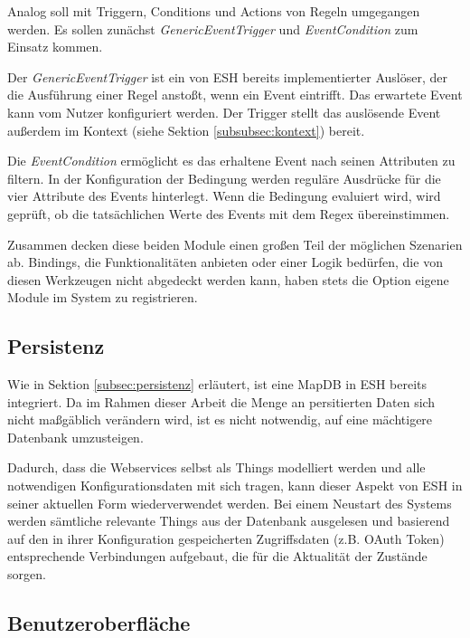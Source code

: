 Analog soll mit Triggern, Conditions und Actions von Regeln umgegangen werden. Es sollen zunächst \textit{GenericEventTrigger} und \textit{EventCondition} zum Einsatz kommen. 

Der \textit{GenericEventTrigger} ist ein von ESH bereits implementierter Auslöser, der die Ausführung einer Regel anstoßt, wenn ein Event eintrifft. Das erwartete Event kann vom Nutzer konfiguriert werden. Der Trigger stellt das auslösende Event außerdem im Kontext (siehe Sektion \ref{subsubsec:kontext}) bereit.

Die \textit{EventCondition} ermöglicht es das erhaltene Event nach seinen Attributen zu filtern. In der Konfiguration der Bedingung werden reguläre Ausdrücke für die vier Attribute des Events hinterlegt. Wenn die Bedingung evaluiert wird, wird geprüft, ob die tatsächlichen Werte des Events mit dem Regex übereinstimmen. 

Zusammen decken diese beiden Module einen großen Teil der möglichen Szenarien ab. Bindings, die Funktionalitäten anbieten oder einer Logik bedürfen, die von diesen Werkzeugen nicht abgedeckt werden kann, haben stets die Option eigene Module im System zu registrieren.




\subsection{Persistenz}
Wie in Sektion \ref{subsec:persistenz} erläutert, ist eine MapDB in ESH bereits integriert. Da im Rahmen dieser Arbeit die Menge an persitierten Daten sich nicht maßgäblich verändern wird, ist es nicht notwendig, auf eine mächtigere Datenbank umzusteigen. 

Dadurch, dass die Webservices selbst als Things modelliert werden und alle notwendigen Konfigurationsdaten mit sich tragen, kann dieser Aspekt von ESH in seiner aktuellen Form wiederverwendet werden. Bei einem Neustart des Systems werden sämtliche relevante Things aus der Datenbank ausgelesen und basierend auf den in ihrer Konfiguration gespeicherten Zugriffsdaten (z.B. OAuth Token) entsprechende Verbindungen aufgebaut, die für die Aktualität der Zustände sorgen.

\subsection{Benutzeroberfläche}
\label{entwurf:gui}

